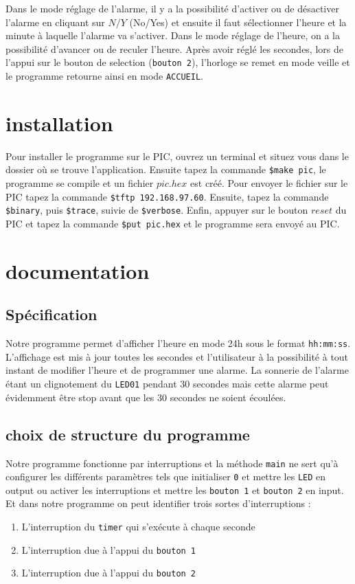 \documentclass{article}
\begin{document}
Dans le mode réglage de l'alarme, il y a la possibilité d'activer ou de désactiver l'alarme en cliquant sur $N/Y$ (No/Yes) et ensuite il faut sélectionner l'heure et la minute à laquelle l'alarme va s'activer.
Dans le mode réglage de l'heure, on a la possibilité d'avancer ou de reculer l'heure.  Après avoir réglé les secondes, lors de l'appui sur le bouton de selection (\texttt{bouton 2}), l'horloge se remet en mode veille et le programme retourne ainsi en mode \texttt{ACCUEIL}.

	\section{installation}
		
		Pour installer le programme sur le PIC, ouvrez un terminal et situez vous dans le dossier où se trouve l'application. Ensuite tapez la commande \texttt{\$make pic}, le programme se compile et un fichier $pic.hex$ est créé.
Pour envoyer le fichier sur le PIC tapez la commande  \texttt{\$tftp 192.168.97.60}.
Ensuite, tapez la commande \texttt{\$binary},  puis \texttt{\$trace}, suivie de \texttt{\$verbose}.
Enfin, appuyer sur le bouton $reset$ du PIC et tapez la commande \texttt{\$put pic.hex} et le programme sera envoyé au PIC.

	\section{documentation}
		\subsection{Spécification}
		Notre programme permet d'afficher l'heure en mode 24h sous le format \texttt{hh:mm:ss}. L'affichage est mis à jour toutes les secondes et l'utilisateur à la possibilité à tout instant de modifier l'heure et de programmer une alarme. La sonnerie de l'alarme étant un clignotement du \texttt{LED01} pendant 30 secondes mais cette alarme peut évidemment être stop avant que les 30 secondes ne soient écoulées.   
		
		\subsection{choix de structure du programme}
		Notre programme fonctionne par interruptions et la méthode \texttt{main} ne sert qu'à configurer les différents paramètres tels que initialiser \texttt{0} et mettre les \texttt{LED} en output ou activer les interruptions et mettre les \texttt{bouton 1} et \texttt{bouton 2} en input. Et dans notre programme on peut identifier trois sortes d'interruptions :\\
		\begin{enumerate}
		\item L'interruption du \texttt{timer} qui s'exécute à chaque seconde
		\item L'interruption due à l'appui du \texttt{bouton 1}
		\item L'interruption due à l'appui du \texttt{bouton 2}\\
		\end{enumerate}
		
\end{document}
